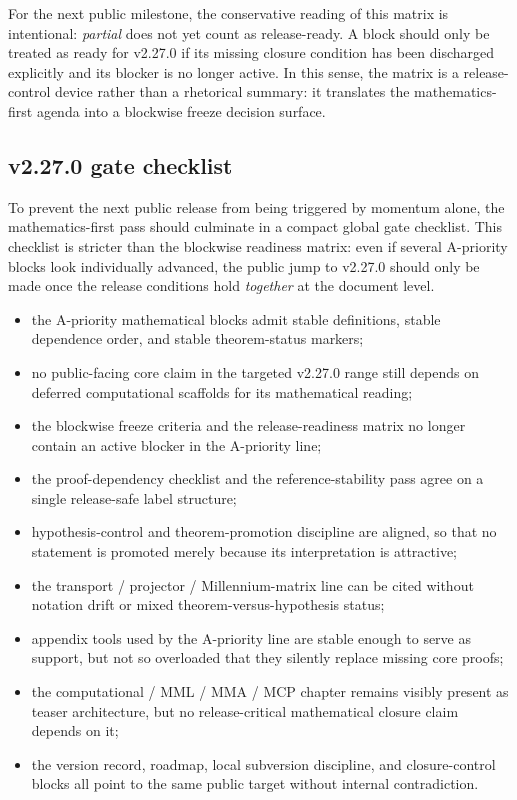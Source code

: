 For the next public milestone, the conservative reading of this matrix is intentional: \emph{partial} does not yet count as release-ready. A block should only be treated as ready for v2.27.0 if its missing closure condition has been discharged explicitly and its blocker is no longer active. In this sense, the matrix is a release-control device rather than a rhetorical summary: it translates the mathematics-first agenda into a blockwise freeze decision surface.



\subsection*{v2.27.0 gate checklist}
To prevent the next public release from being triggered by momentum alone, the mathematics-first pass should culminate in a compact global gate checklist. This checklist is stricter than the blockwise readiness matrix: even if several A-priority blocks look individually advanced, the public jump to v2.27.0 should only be made once the release conditions hold \emph{together} at the document level.

\begin{itemize}[leftmargin=*]
  \item the A-priority mathematical blocks admit stable definitions, stable dependence order, and stable theorem-status markers;
  \item no public-facing core claim in the targeted v2.27.0 range still depends on deferred computational scaffolds for its mathematical reading;
  \item the blockwise freeze criteria and the release-readiness matrix no longer contain an active blocker in the A-priority line;
  \item the proof-dependency checklist and the reference-stability pass agree on a single release-safe label structure;
  \item hypothesis-control and theorem-promotion discipline are aligned, so that no statement is promoted merely because its interpretation is attractive;
  \item the transport / projector / Millennium-matrix line can be cited without notation drift or mixed theorem-versus-hypothesis status;
  \item appendix tools used by the A-priority line are stable enough to serve as support, but not so overloaded that they silently replace missing core proofs;
  \item the computational / MML / MMA / MCP chapter remains visibly present as teaser architecture, but no release-critical mathematical closure claim depends on it;
  \item the version record, roadmap, local subversion discipline, and closure-control blocks all point to the same public target without internal contradiction.
\end{itemize}

